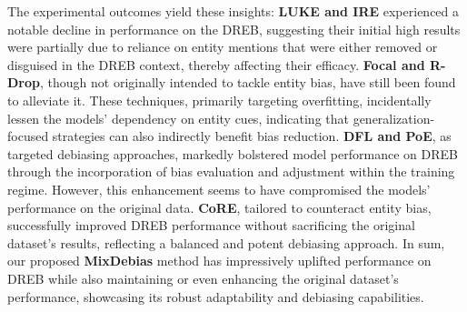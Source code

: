 \documentclass[letterpaper]{article} %
\begin{document}

The experimental outcomes yield these insights: \textbf{LUKE and IRE} experienced a notable decline in performance on the DREB, suggesting their initial high results were partially due to reliance on entity mentions that were either removed or disguised in the DREB context, thereby affecting their efficacy. \textbf{Focal and R-Drop}, though not originally intended to tackle entity bias, have still been found to alleviate it. These techniques, primarily targeting overfitting, incidentally lessen the models' dependency on entity cues, indicating that generalization-focused strategies can also indirectly benefit bias reduction. \textbf{DFL and PoE}, as targeted debiasing approaches, markedly bolstered model performance on DREB through the incorporation of bias evaluation and adjustment within the training regime. However, this enhancement seems to have compromised the models' performance on the original data. \textbf{CoRE}, tailored to counteract entity bias, successfully improved DREB performance without sacrificing the original dataset's results, reflecting a balanced and potent debiasing approach. In sum, our proposed \textbf{MixDebias} method has impressively uplifted performance on DREB while also maintaining or even enhancing the original dataset's performance, showcasing its robust adaptability and debiasing capabilities.
\end{document}
